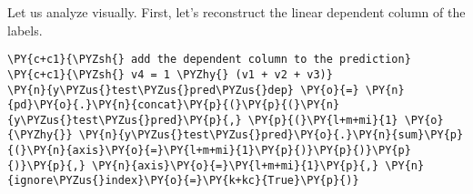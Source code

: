     Let us analyze visually. First, let's reconstruct the linear dependent
column of the labels.

    \begin{tcolorbox}[breakable, size=fbox, boxrule=1pt, pad at break*=1mm,colback=cellbackground, colframe=cellborder]
\begin{Verbatim}[commandchars=\\\{\}]
\PY{c+c1}{\PYZsh{} add the dependent column to the prediction}
\PY{c+c1}{\PYZsh{} v4 = 1 \PYZhy{} (v1 + v2 + v3)}
\PY{n}{y\PYZus{}test\PYZus{}pred\PYZus{}dep} \PY{o}{=} \PY{n}{pd}\PY{o}{.}\PY{n}{concat}\PY{p}{(}\PY{p}{(}\PY{n}{y\PYZus{}test\PYZus{}pred}\PY{p}{,} \PY{p}{(}\PY{l+m+mi}{1} \PY{o}{\PYZhy{}} \PY{n}{y\PYZus{}test\PYZus{}pred}\PY{o}{.}\PY{n}{sum}\PY{p}{(}\PY{n}{axis}\PY{o}{=}\PY{l+m+mi}{1}\PY{p}{)}\PY{p}{)}\PY{p}{)}\PY{p}{,} \PY{n}{axis}\PY{o}{=}\PY{l+m+mi}{1}\PY{p}{,} \PY{n}{ignore\PYZus{}index}\PY{o}{=}\PY{k+kc}{True}\PY{p}{)}
\end{Verbatim}
\end{tcolorbox}

